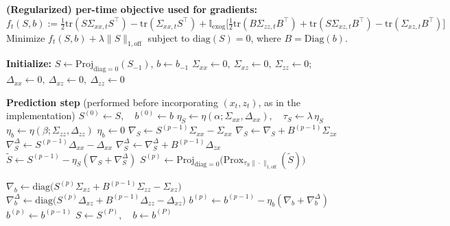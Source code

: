 \begin{algorithm}[t]
\begin{algorithmic}[1]
\State \textbf{(Regularized) per-time objective used for gradients:}
\Statex \hspace{1em} $f_t(S,b) := \tfrac12\mathrm{tr}(S\Sigma_{xx,t}S^\top) - \mathrm{tr}(\Sigma_{xx,t}S^\top)
 + \mathbb{I}_{\text{exog}}\Big[\tfrac12\mathrm{tr}(B\Sigma_{zz,t}B^\top) + \mathrm{tr}(S\Sigma_{xz,t}B^\top) - \mathrm{tr}(\Sigma_{xz,t}B^\top)\Big]$
\Statex \hspace{1em} Minimize $f_t(S,b) + \lambda\|S\|_{1,\mathrm{off}}$ subject to $\mathrm{diag}(S)=0$, where $B=\mathrm{Diag}(b)$.

\State \textbf{Initialize:} $S \gets \mathrm{Proj}_{\mathrm{diag}=0}(S_{-1})$, $b \gets b_{-1}$
\State $\Sigma_{xx}\gets 0,\ \Sigma_{xz}\gets 0,\ \Sigma_{zz}\gets 0$; $\Delta_{xx}\gets 0,\ \Delta_{xz}\gets 0,\ \Delta_{zz}\gets 0$

  \State \textbf{Prediction step} (performed before incorporating $(x_t,z_t)$, as in the implementation)
  \State $S^{(0)} \gets S,\quad b^{(0)} \gets b$
  \State $\eta_S \gets \eta(\alpha;\Sigma_{xx},\Delta_{xx}),\quad \tau_S \gets \lambda\,\eta_S$
    \State $\eta_b \gets \eta(\beta;\Sigma_{zz},\Delta_{zz})$
  \Else
    \State $\eta_b \gets 0$
  \EndIf
    \State $\nabla_S \gets S^{(p-1)}\Sigma_{xx}-\Sigma_{xx}$
      \State $\nabla_S \gets \nabla_S + B^{(p-1)}\Sigma_{zx}$ 
    \EndIf
    \State $\nabla^{\Delta}_S \gets S^{(p-1)}\Delta_{xx}-\Delta_{xx}$
      \State $\nabla^{\Delta}_S \gets \nabla^{\Delta}_S + B^{(p-1)}\Delta_{zx}$
    \EndIf
    \State $\widetilde S \gets S^{(p-1)} - \eta_S(\nabla_S + \nabla^{\Delta}_S)$
    \State $S^{(p)} \gets \mathrm{Proj}_{\mathrm{diag}=0}\!\Big(\mathrm{Prox}_{\tau_S\|\cdot\|_{1,\mathrm{off}}}(\widetilde S)\Big)$

      \State $\nabla_b \gets \mathrm{diag}\!\Big(S^{(p)}\Sigma_{xz} + B^{(p-1)}\Sigma_{zz} - \Sigma_{xz}\Big)$
      \State $\nabla^{\Delta}_b \gets \mathrm{diag}\!\Big(S^{(p)}\Delta_{xz} + B^{(p-1)}\Delta_{zz} - \Delta_{xz}\Big)$
      \State $b^{(p)} \gets b^{(p-1)} - \eta_b(\nabla_b + \nabla^{\Delta}_b)$
    \Else
      \State $b^{(p)} \gets b^{(p-1)}$
    \EndIf
  \EndFor
  \State $S \gets S^{(P)},\quad b \gets b^{(P)}$


\end{algorithmic}
\end{algorithm}
